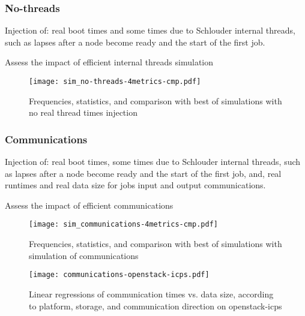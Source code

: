 \subsubsection{No-threads}

Injection of: real boot times and some times due to Schlouder internal threads, 
such as lapses after a node become ready and the start of the first job.

Assess the impact of efficient internal threads simulation

\begin{figure}
  \centering
  \texttt{[image: sim\_no-threads-4metrics-cmp.pdf]}
  
  

  

  
    
  \caption{Frequencies, statistics, and comparison with best of simulations with no real thread times
  injection}
\end{figure} 



\subsubsection{Communications}

Injection of: real boot times, some times due to Schlouder internal threads, 
such as lapses after a node become ready and the start of the first job, 
and, real runtimes and real data size for jobs input and output communications.

Assess the impact of efficient communications 

\begin{figure}
  \centering
  \texttt{[image: sim\_communications-4metrics-cmp.pdf]}
  
  

  

  

  \caption{Frequencies, statistics, and comparison with best of simulations with simulation of communications}
\end{figure} 

\begin{figure}
  \centering
  \texttt{[image: communications-openstack-icps.pdf]}
  
  \caption{Linear regressions of communication times vs. data size, 
    according to platform, storage, and communication direction on openstack-icps}
\end{figure} 


